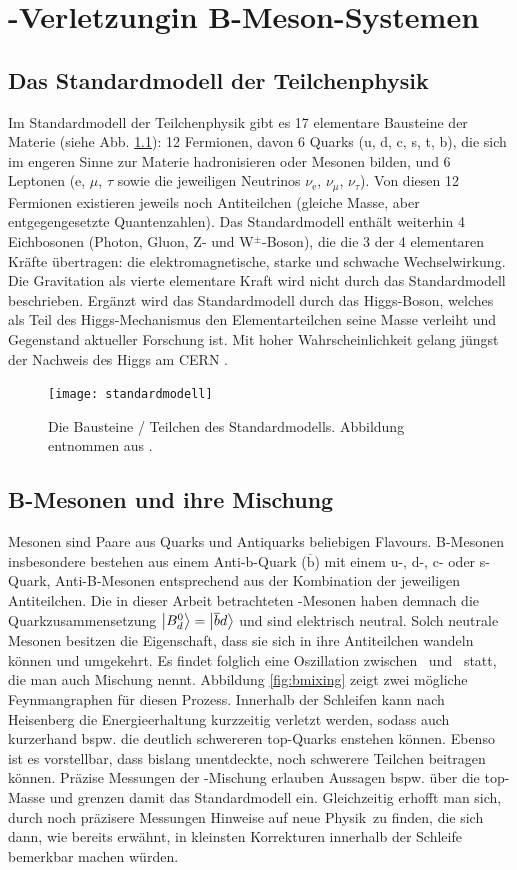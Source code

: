 \chapter{\boldmath\CP-Verletzung\unboldmath in B-Meson-Systemen} \label{kap:cp-verletzung}
\section{Das Standardmodell der Teilchenphysik}
Im Standardmodell der Teilchenphysik gibt es 17 elementare Bausteine der Materie (siehe Abb. \ref{fig:standardmodell}): 12 Fermionen, davon 6 Quarks (u, d, c, s, t, b), die sich im engeren Sinne zur Materie hadronisieren oder Mesonen bilden, und 6 Leptonen (e, $\mu$, $\tau$ sowie die jeweiligen Neutrinos $\nu_{\text{e}}$, $\nu_{\mu}$, $\nu_{\tau}$). Von diesen 12 Fermionen existieren jeweils noch Antiteilchen (gleiche Masse, aber entgegengesetzte Quantenzahlen). Das Standardmodell enthält weiterhin 4 Eichbosonen (Photon, Gluon, Z- und W$^{\pm}$-Boson), die die 3 der 4 elementaren Kräfte übertragen: die elektromagnetische, starke und schwache Wechselwirkung. Die Gravitation als vierte elementare Kraft wird nicht durch das Standardmodell beschrieben. Ergänzt wird das Standardmodell durch das Higgs-Boson, welches als Teil des Higgs-Mechanismus den Elementarteilchen seine Masse verleiht und Gegenstand aktueller Forschung ist. Mit hoher Wahrscheinlichkeit gelang jüngst der Nachweis des Higgs am CERN \cite{higgs}.
\begin{figure}[hptb]
\centering
\texttt{[image: standardmodell]}
\caption{Die Bausteine / Teilchen des Standardmodells. Abbildung entnommen aus \cite{wiki_standard}.}
\label{fig:standardmodell}
\end{figure}

\section{B-Mesonen und ihre Mischung}
Mesonen sind Paare aus Quarks und Antiquarks beliebigen Flavours. B-Mesonen insbesondere bestehen aus einem Anti-b-Quark ($\mathrm{\overline{b}}$) mit einem u-, d-, c- oder s-Quark, Anti-B-Mesonen entsprechend aus der Kombination der jeweiligen Antiteilchen. Die in dieser Arbeit betrachteten \Bd-Mesonen haben demnach die Quarkzusammensetzung $\Ket{\text{$B_d^0$}} = \Ket{\overline{b}d}$ und sind elektrisch neutral. Solch neutrale Mesonen besitzen die Eigenschaft, dass sie sich in ihre Antiteilchen wandeln können und umgekehrt. Es findet folglich eine Oszillation zwischen \Bd\ und \Bdbar\ statt, die man auch Mischung nennt. Abbildung \ref{fig:bmixing} zeigt zwei mögliche Feynmangraphen für diesen Prozess. Innerhalb der Schleifen kann nach Heisenberg die Energieerhaltung kurzzeitig verletzt werden, sodass auch kurzerhand bspw. die deutlich schwereren top-Quarks enstehen können. Ebenso ist es vorstellbar, dass bislang unentdeckte, noch schwerere Teilchen beitragen können. Präzise Messungen der \Bd-Mischung erlauben Aussagen bspw. über die top-Masse und grenzen damit das Standardmodell ein. Gleichzeitig erhofft man sich, durch noch präzisere Messungen Hinweise auf \glqq neue Physik\grqq\ zu finden, die sich dann, wie bereits erwähnt, in kleinsten Korrekturen innerhalb der Schleife bemerkbar machen würden.

